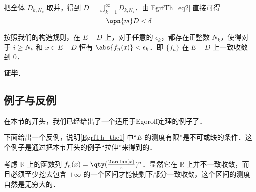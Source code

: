 把全体 $D_{k, N_k}$ 取并，得到 $D=\bigcup_{k=1}^\infty D_{k, N_k}$．由\autoref{EgrfTh_eq2} 直接可得
\begin{equation}
\opn{m}D<\delta
\end{equation}

按照我们的构造规则，在 $E-D$ 上，对于任意的 $\epsilon_k$，都存在正整数 $N_k$，使得对于 $i\geq N_k$ 和 $x\in E-D$ 恒有 $\abs{f_n(x)}<\epsilon_k$．即 $\{f_n\}$ 在 $E-D$ 上一致收敛到 $0$．

\textbf{证毕}．


\subsection{例子与反例}

在本节的开头，我们已经给出了一个适用于Egoroff定理的例子了．

下面给出一个反例，说明\autoref{EgrfTh_the1} 中“$E$ 的测度有限”是不可或缺的条件．这个例子是通过把本节开头的例子“拉伸”来得到的．


\begin{example}{}

考虑 $\mathbb{R}$ 上的函数列 $f_n(x)=\qty(\frac{2\arctan(x)}{\pi})^n$．显然它在 $\mathbb{R}$ 上并不一致收敛，而且必须至少挖去包含 $+\infty$ 的一个区间才能使剩下部分一致收敛，这个区间的测度自然是无穷大的．

\end{example}















